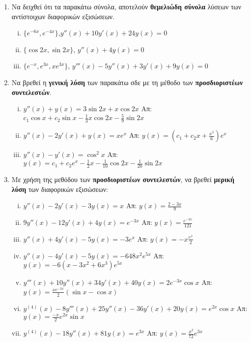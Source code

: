 \documentclass[a4paper,table]{report}
\begin{document}
\begin{center}
  \minibox{\large\bfseries \textcolor{Col1}{Ασκήσεις ΣΔΕ 2ης ταξης}}
\end{center}

\vspace{\baselineskip}

\begin{enumerate}
  \item Να δειχθεί ότι τα  παρακάτω σύνολα, αποτελούν \textbf{θεμελιώδη σύνολα} 
    λύσεων των αντίστοιχων διαφορικών εξισώσεων.
    \begin{enumerate}[i)]
      \item $ \{ e^{-6x}, e^{-4x} \} $,\quad $ y''(x)+10y'(x)+24y(x)=0 $ 
      \item $ \{ \cos{2x}, \sin{2x} \}$, \quad $ y''(x)+4y(x)=0 $
      \item $ \{ e^{-x}, e^{3x}, xe^{3x} \} $, \quad $ y'''(x)-5y''(x)+3y'(x)+9y(x)=0 $
    \end{enumerate}

  \item Να βρεθεί η \textbf{γενική λύση} των παρακάτω σδε με τη μέθοδο των 
    \textbf{προσδιοριστέων συντελεστών}.
    \begin{enumerate}[i)]
      \item $y''(x)+y(x)=3\sin 2x + x\cos 2x$ 
        \hfill Απ: $c_{1}\cos x+c_{2}\sin x-\frac{1}{3}x\cos 2x-\frac{5}{9}\sin 2x $
      \item $y''(x)-2y'(x)+y(x)=xe^{x}$ 
        \hfill Απ:  $y(x)=(c_{1}+c_{2}x+\frac{x^{3}}{6})e^{x}$
      \item $y''(x)-y'(x)=\cos^{2}x$ 
        \hfill Απ: $y(x) =c_{1}+c_{2}e^{x}-\frac{1}{2}x-\frac{1}{10}\cos 2x- 
        \frac{1}{20}\sin 2x$
    \end{enumerate}

  \item Με χρήση της μεθόδου των \textbf{προσδιοριστέων συντελεστών}, να βρεθεί 
    \textbf{μερική λύση} των διαφορικών εξισώσεων:
    \begin{enumerate}[i)]
      \item $y''(x)-2y'(x)-3y(x)=x$ \hfill Απ: $y(x)=\frac{2-3x}{9}$
      \item $9y''(x)-12y'(x)+4y(x)=e^{-3x}$ \hfill Απ: $y(x)=\frac{e^{-3x}}{121}$
      \item $y''(x)+4y'(x)-5y(x)=-3e^{x}$ \hfill Απ: $y(x)=-x\frac{e^{x}}{2}$
      \item $y''(x)-4y'(x)-5y(x)=-648x^{2}e^{5x}$ 
        \hfill Απ: $ y(x)=-6(x-3x^{2}+6x^{3})e^{5x}$
      \item $y'''(x)+10y''(x)+34y'(x)+40y(x)=2e^{-3x}\cos x$ 
        \hfill Απ: $y(x)= \frac{xe^{-3x}}{2}(\sin x - \cos x)$
      \item $y^{(4)}(x)-8y'''(x)+25y''(x)-36y'(x)+20y(x)=e^{2x}\cos x$ 
        \hfill Απ: $y(x) =\frac{-x}{2}e^{2x}\sin x$
      \item $y^{(4)}(x)-18y''(x)+81y(x)=e^{3x}$ \hfill Απ: $y(x)=\frac{x^{2}}{72}e^{3x}$
    \end{enumerate}


\end{enumerate}
\end{document}
